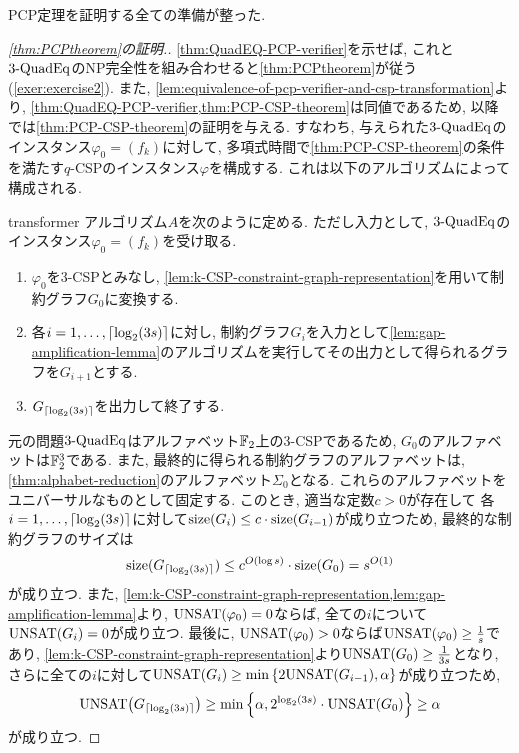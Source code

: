 PCP定理を証明する全ての準備が整った.
\begin{proof}[\cref{thm:PCPtheorem}の証明.]
  \cref{thm:QuadEQ-PCP-verifier}を示せば, これと$\text{3-QuadEq}$のNP完全性を組み合わせると\cref{thm:PCPtheorem}が従う (\cref{exer:exercise2}).
  また, \cref{lem:equivalence-of-pcp-verifier-and-csp-transformation}より,
\cref{thm:QuadEQ-PCP-verifier,thm:PCP-CSP-theorem}は同値であるため, 以降では\cref{thm:PCP-CSP-theorem}の証明を与える.
  すなわち, 与えられた$\text{3-QuadEq}$のインスタンス$\varphi_0=(f_k)$に対して, 多項式時間で\cref{thm:PCP-CSP-theorem}の条件を満たす$q$-CSPのインスタンス$\varphi$を構成する.
  これは以下のアルゴリズムによって構成される.

  \begin{algo}{}{transformer}
    アルゴリズム$A$を次のように定める.
    ただし入力として, $\text{3-QuadEq}$のインスタンス$\varphi_0=(f_k)$を受け取る.
    \begin{enumerate}
      \item $\varphi_0$を$3$-CSPとみなし, \cref{lem:k-CSP-constraint-graph-representation}を用いて制約グラフ$G_0$に変換する.
      \item 各$i=1,\dots,\lceil\log_2 (3s)\rceil$に対し, 制約グラフ$G_i$を入力として\cref{lem:gap-amplification-lemma}のアルゴリズムを実行してその出力として得られるグラフを$G_{i+1}$とする.
      \item $G_{\lceil\log_2 (3s)\rceil}$を出力して終了する.
    \end{enumerate}
  \end{algo}

  元の問題$\text{3-QuadEq}$はアルファベット$\mathbb{F}_2$上の3-CSPであるため, $G_0$のアルファベットは$\mathbb{F}_2^3$である.
  また, 最終的に得られる制約グラフのアルファベットは, \cref{thm:alphabet-reduction}のアルファベット$\Sigma_0$となる.
  これらのアルファベットをユニバーサルなものとして固定する.
  このとき, 適当な定数$c>0$が存在して
  各$i=1,\dots,\lceil\log_2 (3s)\rceil$に対して$\mathrm{size}(G_i) \le c \cdot \mathrm{size}(G_{i-1})$が成り立つため, 最終的な制約グラフのサイズは
  \begin{align*}
    \mathrm{size}(G_{\lceil\log_2 (3s)\rceil}) \le c^{O(\log s)} \cdot \mathrm{size}(G_0) = s^{O(1)}
  \end{align*}
  が成り立つ.
  また, \cref{lem:k-CSP-constraint-graph-representation,lem:gap-amplification-lemma}より, $\mathrm{UNSAT}(\varphi_0)=0$ならば, 全ての$i$について$\mathrm{UNSAT}(G_i)=0$が成り立つ.
  最後に, $\mathrm{UNSAT}(\varphi_0)>0$ならば$\mathrm{UNSAT}(\varphi_0)\ge \frac{1}{s}$であり, \cref{lem:k-CSP-constraint-graph-representation}より$\mathrm{UNSAT}(G_0)\ge \frac{1}{3s}$となり, さらに全ての$i$に対して$\mathrm{UNSAT}(G_i) \ge \min\qty{ 2\mathrm{UNSAT}(G_{i-1}), \alpha }$が成り立つため,
  \begin{align*}
    \mathrm{UNSAT}\qty(G_{\lceil\log_2 (3s)\rceil}) \ge \min\qty{ \alpha, 2^{\log_2 (3s)}\cdot\mathrm{UNSAT}(G_0) } \ge \alpha
  \end{align*}
  が成り立つ. 
\end{proof}